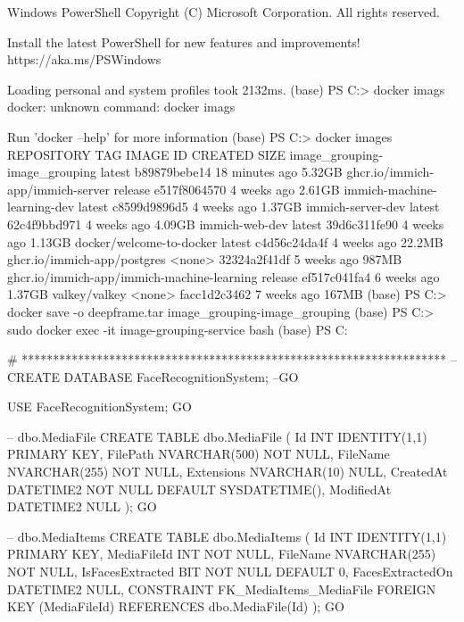 Windows PowerShell
Copyright (C) Microsoft Corporation. All rights reserved.

Install the latest PowerShell for new features and improvements! https://aka.ms/PSWindows

Loading personal and system profiles took 2132ms.
(base) PS C:\Users\ADMIN> docker imags
docker: unknown command: docker imags

Run 'docker --help' for more information
(base) PS C:\Users\ADMIN> docker images
REPOSITORY                                   TAG       IMAGE ID       CREATED          SIZE
image_grouping-image_grouping                latest    b89879bebe14   18 minutes ago   5.32GB
ghcr.io/immich-app/immich-server             release   e517f8064570   4 weeks ago      2.61GB
immich-machine-learning-dev                  latest    c8599d9896d5   4 weeks ago      1.37GB
immich-server-dev                            latest    62c4f9bbd971   4 weeks ago      4.09GB
immich-web-dev                               latest    39d6c311fe90   4 weeks ago      1.13GB
docker/welcome-to-docker                     latest    c4d56c24da4f   4 weeks ago      22.2MB
ghcr.io/immich-app/postgres                  <none>    32324a2f41df   5 weeks ago      987MB
ghcr.io/immich-app/immich-machine-learning   release   ef517c041fa4   6 weeks ago      1.37GB
valkey/valkey                                <none>    facc1d2c3462   7 weeks ago      167MB
(base) PS C:\Users\ADMIN> docker save -o deepframe.tar image_grouping-image_grouping
(base) PS C:\Users\ADMIN> sudo docker exec -it image-grouping-service bash
(base) PS C:\Users\ADMIN





# ********************************************************************
--CREATE DATABASE FaceRecognitionSystem;
--GO

USE FaceRecognitionSystem;
GO

-- dbo.MediaFile
CREATE TABLE dbo.MediaFile (
    Id INT IDENTITY(1,1) PRIMARY KEY,
    FilePath NVARCHAR(500) NOT NULL,
    FileName NVARCHAR(255) NOT NULL,
    Extensions NVARCHAR(10) NULL,
    CreatedAt DATETIME2 NOT NULL DEFAULT SYSDATETIME(),
    ModifiedAt DATETIME2 NULL
);
GO

-- dbo.MediaItems
CREATE TABLE dbo.MediaItems (
    Id INT IDENTITY(1,1) PRIMARY KEY,
    MediaFileId INT NOT NULL,
    FileName NVARCHAR(255) NOT NULL,
    IsFacesExtracted BIT NOT NULL DEFAULT 0,
    FacesExtractedOn DATETIME2 NULL,
    CONSTRAINT FK_MediaItems_MediaFile FOREIGN KEY (MediaFileId) REFERENCES dbo.MediaFile(Id)
);
GO

